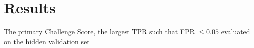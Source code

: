 \section{Results}
\label{sec:results}


The primary Challenge Score, the largest TPR such that FPR $\le 0.05$ evaluated on the hidden validation set 



